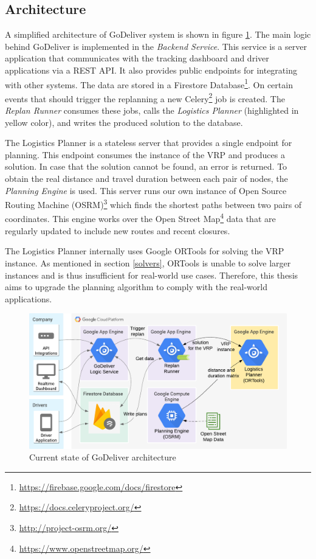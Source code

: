     \subsection{Architecture} \label{sec:godeliver-current-state}
    
    A simplified architecture of GoDeliver system is shown in figure \ref{fig:godeliver-architecture-old}. The  main logic behind GoDeliver is implemented in the \emph{Backend Service}. This service is a server application that communicates with the tracking dashboard and driver applications via a REST API. It also provides public endpoints for integrating with other systems. The data are stored in a Firestore Database\footnote{\url{https://firebase.google.com/docs/firestore}}. On certain events that should trigger the replanning a new Celery\footnote{\url{https://docs.celeryproject.org/}} job is created. The \emph{Replan Runner} consumes these jobs, calls the \emph{Logistics Planner} (highlighted in yellow color), and writes the produced solution to the database.
    
    The Logistics Planner is a stateless server that provides a single endpoint for planning. This endpoint consumes the instance of the VRP and produces a solution. In case that the solution cannot be found, an error is returned. To obtain the real distance and travel duration between each pair of nodes, the \emph{Planning Engine} is used. This server runs our own instance of Open Source Routing Machine (OSRM)\footnote{\url{http://project-osrm.org/}} which finds the shortest paths between two pairs of coordinates. This engine works over the Open Street Map\footnote{\url{https://www.openstreetmap.org/}} data that are regularly updated to include new routes and recent closures.
    
    The Logistics Planner internally uses Google ORTools for solving the VRP instance. As mentioned in section \ref{solvers}, ORTools is unable to solve larger instances and is thus insufficient for real-world use cases. Therefore, this thesis aims to upgrade the planning algorithm to comply with the real-world applications.

    \begin{figure}[ht]
        \centering
        \includegraphics[width=1\textwidth]{figures/godeliver-architecture-old.pdf}
        \caption{Current state of GoDeliver architecture}
        \label{fig:godeliver-architecture-old}
    \end{figure}
